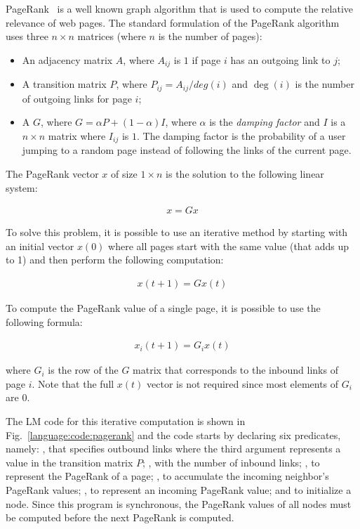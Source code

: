PageRank~\cite{Page:2001:MNR} is a well known graph algorithm that is used to
compute the relative relevance of web pages. The standard formulation of the
PageRank algorithm uses three $n \times n$ matrices (where $n$ is the number of
pages):

\begin{itemize}

   \item An adjacency matrix $A$, where $A_{ij}$ is $1$ if page $i$ has an
      outgoing link to $j$;

   \item A transition matrix $P$, where $P_{ij} = A_{ij}/deg(i)$ and $\deg(i)$
      is the number of outgoing links for page $i$;

   \item A  $G$, where $G = \alpha P + (1-\alpha)I$, where
      $\alpha$ is the \emph{damping factor} and $I$ is a $n \times n$ matrix
      where $I_{ij}$ is $1$. The damping factor is the probability of a user
      jumping to a random page instead of following the links of the current
      page.

\end{itemize}

The PageRank vector $x$ of size $1 \times n$ is the solution to the following
linear system:

\begin{align}
x = G x
\end{align}

To solve this problem, it is possible to use an iterative method by starting
with an initial vector $x(0)$ where all pages start with the same value (that
adds up to 1) and then perform the following computation:

\begin{align}
x(t + 1) = G x(t)
\end{align}

To compute the PageRank value of a single page, it is possible to use the
following formula:

\begin{align}
x_{i}(t + 1) = G_{i} x(t)\label{eq:language:pagerank}
\end{align}

\noindent where $G_{i}$ is the row of the $G$ matrix that corresponds to the
inbound links of page $i$. Note that the full $x(t)$ vector is not required
since most elements of $G_{i}$ are $0$.

The LM code for this iterative computation is shown in
Fig.~\ref{language:code:pagerank} and the code starts by declaring six
predicates, namely: , that specifies outbound links where the
third argument represents a value in the transition matrix $P$;
, with the number of inbound links; , to
represent the PageRank of a page; , to accumulate the incoming
neighbor's PageRank values; , to represent an incoming
PageRank value; and  to initialize a node.  Since this program is
synchronous, the PageRank values of all nodes must be computed before the next
PageRank is computed.

